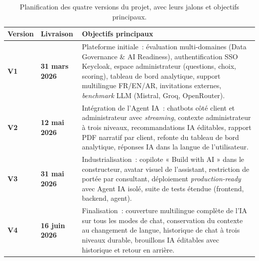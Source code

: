 \documentclass[12pt,a4paper]{report}
\begin{document}
\begin{table}[H]
\centering
\caption{Planification des quatre versions du projet, avec leurs jalons et objectifs principaux.}
\begin{tabularx}{\textwidth}{>{\bfseries}L{2.0cm}>{\bfseries}L{2.3cm}Y}
\toprule
Version & Livraison & Objectifs principaux \\
\midrule
V1 & 31 mars 2026 & Plateforme initiale~: évaluation multi-domaines (Data Governance \& AI Readiness), authentification SSO Keycloak, espace administrateur (questions, choix, scoring), tableau de bord analytique, support multilingue FR/EN/AR, invitations externes, \textit{benchmark} LLM (Mistral, Groq, OpenRouter). \\
V2 & 12 mai 2026 & Intégration de l'Agent IA~: chatbots côté client et administrateur avec \textit{streaming}, contexte administrateur à trois niveaux, recommandations IA éditables, rapport PDF narratif par client, refonte du tableau de bord analytique, réponses IA dans la langue de l'utilisateur. \\
V3 & 31 mai 2026 & Industrialisation~: copilote « Build with AI » dans le constructeur, avatar visuel de l'assistant, restriction de portée par consultant, déploiement \textit{production-ready} avec Agent IA isolé, suite de tests étendue (frontend, backend, agent). \\
V4 & 16 juin 2026 & Finalisation~: couverture multilingue complète de l'IA sur tous les modes de chat, conservation du contexte au changement de langue, historique de chat à trois niveaux durable, brouillons IA éditables avec historique et retour en arrière. \\
\bottomrule
\end{tabularx}
\label{tab:versions}
\end{table}
\end{document}
